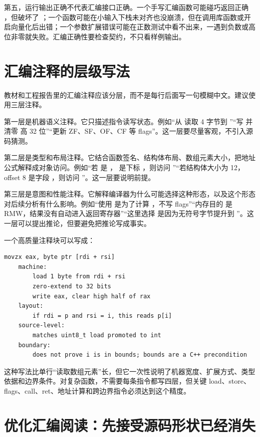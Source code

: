 第五，运行输出正确不代表汇编接口正确。一个手写汇编函数可能碰巧返回正确 ，但破坏了 ；一个函数可能在小输入下栈未对齐也没崩溃，但在调用库函数或开启向量化后出错；一个参数扩展错误可能在正数测试中看不出来，一遇到负数或高位非零就失败。汇编正确性要检查契约，不只看样例输出。

\section{汇编注释的层级写法}

教材和工程报告里的汇编注释应该分层，而不是每行后面写一句模糊中文。建议使用三层注释。

第一层是机器语义注释。它只描述指令读写状态。例如“从  读取 4 字节到 ”“写  并清零  高 32 位”“更新 ZF、SF、OF、CF 等 flags”。这一层要尽量客观，不引入源码猜测。

第二层是类型和布局注释。它结合函数签名、结构体布局、数组元素大小，把地址公式解释成对象访问。例如“若  是 ， 是下标 ，则访问 ”“若结构体大小为 12，offset 8 是字段 ，则访问 ”。这一层要说明前提。

第三层是意图和性能注释。它解释编译器为什么可能选择这种形态，以及这个形态对后续分析有什么影响。例如“使用  是为了计算 ，不写 flags”“内存目的  是 RMW，结果没有自动进入返回寄存器”“这里选择  是因为无符号字节提升到 ”。这一层可以提出推论，但要避免把推论写成事实。

一个高质量注释块可以写成：

\begin{lstlisting}
movzx eax, byte ptr [rdi + rsi]
    machine:
        load 1 byte from rdi + rsi
        zero-extend to 32 bits
        write eax, clear high half of rax
    layout:
        if rdi = p and rsi = i, this reads p[i]
    source-level:
        matches uint8_t load promoted to int
    boundary:
        does not prove i is in bounds; bounds are a C++ precondition
\end{lstlisting}

这种写法比单行“读取数组元素”长，但它一次性说明了机器宽度、扩展方式、类型依据和边界条件。对复杂函数，不需要每条指令都写四层，但关键 load、store、flags、call、ret、地址计算和跨边界指令必须达到这个精度。

\section{优化汇编阅读：先接受源码形状已经消失}

